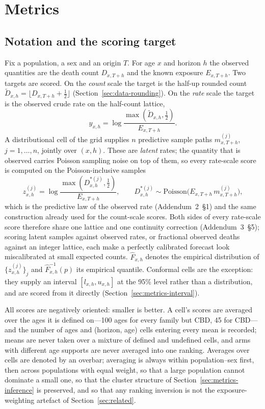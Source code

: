 \section{Metrics}
\label{sec:metrics}

\subsection{Notation and the scoring target}
\label{sec:metrics-target}

Fix a population, a sex and an origin $T$. For age $x$ and horizon $h$ the
observed quantities are the death count $D_{x,T+h}$ and the known exposure
$E_{x,T+h}$. Two targets are scored. On the \emph{count} scale the target is
the half-up rounded count $\tilde D_{x,h}=\lfloor D_{x,T+h}+\tfrac12\rfloor$
(Section~\ref{sec:data-rounding}). On the \emph{rate} scale the target is
the observed crude rate on the half-count lattice,
\begin{equation}
  y_{x,h} = \log\frac{\max(\tilde D_{x,h},\tfrac12)}{E_{x,T+h}}.
\end{equation}
A distributional cell of the grid supplies $n$ predictive sample paths
$m^{(j)}_{x,T+h}$, $j=1,\dots,n$, jointly over $(x,h)$. These are
\emph{latent} rates; the quantity that is observed carries Poisson sampling
noise on top of them, so every rate-scale score is computed on the
Poisson-inclusive samples
\begin{equation}
  z^{(j)}_{x,h} = \log\frac{\max(D^{\ast(j)}_{x,h},\tfrac12)}{E_{x,T+h}},
  \qquad D^{\ast(j)}_{x,h}\sim\mathrm{Poisson}\big(E_{x,T+h}\,m^{(j)}_{x,T+h}\big),
  \label{eq:poisson-inclusive}
\end{equation}
which is the predictive law of the observed rate (Addendum~2~\S1) and the
same construction already used for the count-scale scores. Both sides of
every rate-scale score therefore share one lattice and one continuity
correction (Addendum~3~\S5); scoring latent samples against observed rates,
or fractional observed deaths against an integer lattice, each make a
perfectly calibrated forecast look miscalibrated at small expected counts.
$\hat F_{x,h}$ denotes the empirical distribution of $\{z^{(j)}_{x,h}\}_j$
and $\hat F^{-1}_{x,h}(p)$ its empirical quantile. Conformal cells are the
exception: they supply an interval $[l_{x,h},u_{x,h}]$ at the 95\% level
rather than a distribution, and are scored from it directly
(Section~\ref{sec:metrics-interval}).

All scores are negatively oriented: smaller is better. A cell's scores are
averaged over the ages it is defined on---100 ages for every family but
CBD, 45 for CBD---and the number of ages and (horizon, age) cells entering
every mean is recorded; means are never taken over a mixture of defined and
undefined cells, and arms with different age supports are never averaged
into one ranking. Averages over cells are denoted by an overbar; averaging
is always within population--sex first, then across populations with equal
weight, so that a large population cannot dominate a small one, so that
the cluster structure of Section~\ref{sec:metrics-inference} is preserved,
and so that any ranking inversion is not the exposure-weighting artefact of
Section~\ref{sec:related}.

